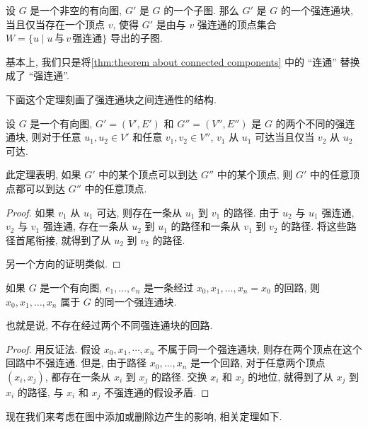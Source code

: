 \begin{theorem}
    设 $G$ 是一个非空的有向图, $G'$ 是 $G$ 的一个子图. 那么 $G'$ 是 $G$ 的一个强连通块, 当且仅当存在一个顶点 $v$, 使得 $G'$ 是由与 $v$ 强连通的顶点集合 $W=\{u\mid u\,\text{与}\,v\,\text{强连通}\}$ 导出的子图.
\end{theorem}

基本上, 我们只是将\cref{thm:theorem about connected components} 中的 ``连通'' 替换成了 ``强连通''.

下面这个定理刻画了强连通块之间连通性的结构.

\begin{theorem}
    设 $G$ 是一个有向图, $G'=(V',E')$ 和 $G''=(V'',E'')$ 是 $G$ 的两个不同的强连通块, 则对于任意 $u_1,u_2\in V'$ 和任意 $v_1,v_2\in V''$, $v_1$ 从 $u_1$ 可达当且仅当 $v_2$ 从 $u_2$ 可达.
\end{theorem}

此定理表明, 如果 $G'$ 中的某个顶点可以到达 $G''$ 中的某个顶点, 则 $G'$ 中的任意顶点都可以到达 $G''$ 中的任意顶点.

\begin{proof}
    如果 $v_1$ 从 $u_1$ 可达, 则存在一条从 $u_1$ 到 $v_1$ 的路径. 由于 $u_2$ 与 $u_1$ 强连通, $v_2$ 与 $v_1$ 强连通, 存在一条从 $u_2$ 到 $u_1$ 的路径和一条从 $v_1$ 到 $v_2$ 的路径. 将这些路径首尾衔接, 就得到了从 $u_2$ 到 $v_2$ 的路径.

    另一个方向的证明类似.
\end{proof}

\begin{theorem}
    如果 $G$ 是一个有向图, $e_1,\dots,e_n$ 是一条经过 $x_0,x_1,\dots,x_n=x_0$ 的回路, 则 $x_0,x_1,\dots,x_n$ 属于 $G$ 的同一个强连通块.
\end{theorem}

也就是说, 不存在经过两个不同强连通块的回路.

\begin{proof}
    用反证法. 假设 $x_0,x_1,\cdots,x_n$ 不属于同一个强连通块, 则存在两个顶点在这个回路中不强连通. 但是, 由于路径 $x_0,\dots,x_n$ 是一个回路, 对于任意两个顶点 $(x_i,x_j)$, 都存在一条从 $x_i$ 到 $x_j$ 的路径. 交换 $x_i$ 和 $x_j$ 的地位, 就得到了从 $x_j$ 到 $x_i$ 的路径, 与 $x_i$ 和 $x_j$ 不强连通的假设矛盾.
\end{proof}

现在我们来考虑在图中添加或删除边产生的影响, 相关定理如下.

